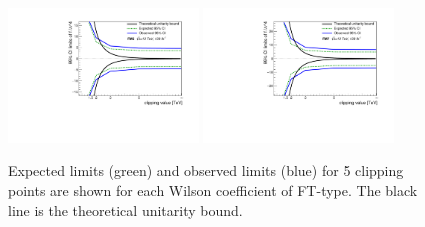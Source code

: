 \begin{figure}[ht]
   \includegraphics[width=0.45\textwidth]{figures/aQGC/FM5limit.pdf}
   \includegraphics[width=0.45\textwidth]{figures/aQGC/FM7limit.pdf}
   \caption{Expected limits (green) and observed limits (blue) for 5 clipping points are shown for each Wilson coefficient of FT-type. 
   The black line is the theoretical unitarity bound.}
        \label{fig:aQGClimitsFMs}
\end{figure}
